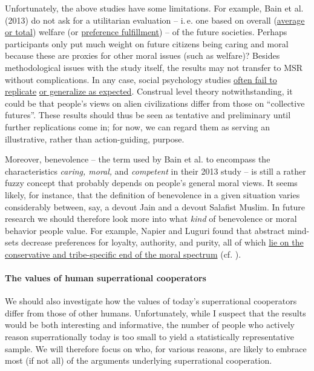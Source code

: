 Unfortunately, the above studies have some limitations. For example,
Bain et al. (2013) do not ask for a utilitarian evaluation -- i.\,e. one
based on overall
(\href{https://en.wikipedia.org/wiki/Average_and_total_utilitarianism}{average
or total}) welfare (or
\href{https://en.wikipedia.org/wiki/Preference_utilitarianism}{preference
fulfillment}) -- of the future societies. Perhaps participants only put
much weight on future citizens being caring and moral because these are
proxies for other moral issues (such as welfare)? Besides methodological
issues with the study itself, the results may not transfer to MSR
without complications. In any case, social psychology studies
\href{https://en.wikipedia.org/wiki/Replication_crisis}{often fail
to replicate}
\href{http://www.openphilanthropy.org/2017-report-consciousness-and-moral-patienthood\#AppendixZ8}{or
generalize as expected}. Construal level theory notwithstanding, it
could be that people's views on alien civilizations differ from those on
``collective futures''. These results should thus be seen as tentative
and preliminary until further replications come in; for now, we can
regard them as serving an illustrative, rather than action-guiding,
purpose.

Moreover, benevolence -- the term used by Bain et al. to encompass the
characteristics \emph{caring, moral,} and \emph{competent} in their 2013
study -- is still a rather fuzzy concept that probably depends on
people's general moral views. It seems likely, for instance, that the
definition of benevolence in a given situation varies considerably
between, say, a devout Jain and a devout Salafist Muslim. In future
research we should therefore look more into what \emph{kind} of
benevolence or moral behavior people value. For example,
Napier and Luguri found that abstract mind-sets
decrease preferences for loyalty, authority, and purity, all of which
\href{https://en.wikipedia.org/wiki/Moral_foundations_theory\#Political_ideology}{lie on the
conservative and tribe-specific end of the moral spectrum} (cf. \cite{luguri2013two}).

\paragraph{The values of human superrational
cooperators}\label{the-values-of-human-superrational-cooperators}

We should also investigate how the values of today's superrational
cooperators differ from those of other humans. Unfortunately, while I
suspect that the results would be both interesting and informative, the
number of people who actively reason superrationally today is too small
to yield a statistically representative sample. We will therefore focus
on who, for various reasons, are likely to embrace most (if not all) of
the arguments underlying superrational cooperation.

